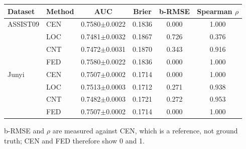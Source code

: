 \begin{widetable}
\centering
\caption{Real multi-institution logs: test-set prediction and agreement with the centralised reference, mean over seeds ($\pm$ s.d. for AUC).}
\label{tab:real}
\small
\begin{tabular}{llcccc}
\toprule
Dataset & Method & AUC & Brier & b-RMSE & Spearman $\rho$ \\
\midrule
ASSIST09 & CEN & 0.7580$\pm$0.0022 & 0.1836 & 0.000 & 1.000 \\
 & LOC & 0.7481$\pm$0.0032 & 0.1867 & 0.726 & 0.376 \\
 & CNT & 0.7472$\pm$0.0031 & 0.1870 & 0.343 & 0.916 \\
 & FED & 0.7580$\pm$0.0022 & 0.1836 & 0.000 & 1.000 \\
\midrule
Junyi & CEN & 0.7507$\pm$0.0002 & 0.1714 & 0.000 & 1.000 \\
 & LOC & 0.7513$\pm$0.0003 & 0.1712 & 0.271 & 0.938 \\
 & CNT & 0.7482$\pm$0.0003 & 0.1721 & 0.272 & 0.953 \\
 & FED & 0.7507$\pm$0.0002 & 0.1714 & 0.000 & 1.000 \\
\bottomrule
\end{tabular}
\par\smallskip\footnotesize b-RMSE and $\rho$ are measured against CEN, which is a reference, not ground truth; CEN and FED therefore show 0 and 1.
\end{widetable}
